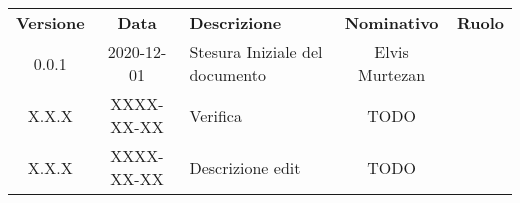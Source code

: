 {
    \renewcommand{\arraystretch}{1.5}
    \centering
    \begin{longtable}{ c c  C{4cm}  c  c }
        \rowcolor{\primaryColor}
        \textcolor{\secondaryColor}{
        \textbf{Versione}}     & \textcolor{\secondaryColor}{\textbf{Data}}       & \textcolor{\secondaryColor}
        {\textbf{Descrizione}} & \textcolor{\secondaryColor}{\textbf{Nominativo}} & \textcolor{\secondaryColor}{\textbf{Ruolo}}                          \\


        0.0.1                  & 2020-12-01                                       & Stesura Iniziale del documento              & Elvis Murtezan & \responsabile{} \\
        X.X.X                  & XXXX-XX-XX                                       & Verifica                                    & TODO & \verificatore{} \\
        X.X.X                  & XXXX-XX-XX                                       & Descrizione edit                            & TODO & \redattore{}    \\
    \end{longtable}
}